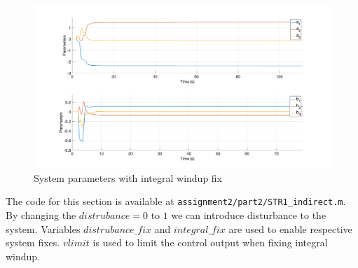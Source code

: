 \begin{figure}
	\centering
	\includegraphics[width=\textwidth]{images/str85.png}
	\caption{System parameters with integral windup fix}
	\label{fig:str85}
\end{figure}

The code  for this section is available at \lstinline|assignment2/part2/STR1_indirect.m|. By changing the $distrubance=0$ to $1$ we can introduce disturbance to the system. Variables $distrubance\_fix$ and $integral\_fix$ are used to enable respective system fixes. $vlimit$ is used to limit the control output when fixing integral windup.


